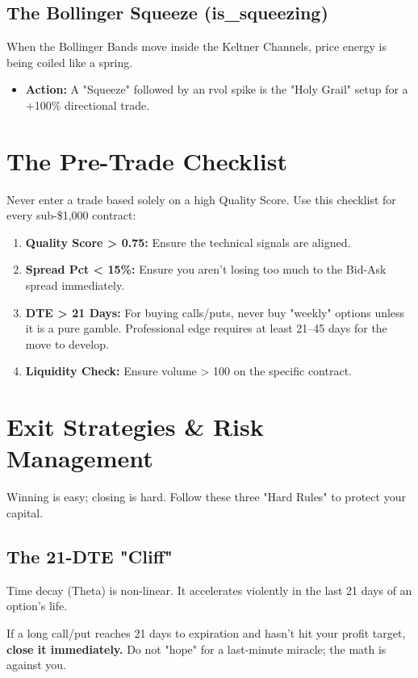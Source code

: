\documentclass[11pt,a4paper]{article}
\begin{document}
\subsection{The Bollinger Squeeze (is\_squeezing)}
When the Bollinger Bands move inside the Keltner Channels, price energy is being coiled like a spring.
\begin{itemize}
    \item \textbf{Action:} A "Squeeze" followed by an rvol spike is the "Holy Grail" setup for a +100\% directional trade.
\end{itemize}

\section{The Pre-Trade Checklist}
Never enter a trade based solely on a high Quality Score. Use this checklist for every sub-\$1,000 contract:

\begin{enumerate}
    \item \textbf{Quality Score > 0.75:} Ensure the technical signals are aligned.
    \item \textbf{Spread Pct < 15\%:} Ensure you aren't losing too much to the Bid-Ask spread immediately.
    \item \textbf{DTE > 21 Days:} For buying calls/puts, never buy "weekly" options unless it is a pure gamble. Professional edge requires at least 21--45 days for the move to develop.
    \item \textbf{Liquidity Check:} Ensure volume > 100 on the specific contract.
\end{enumerate}

\section{Exit Strategies \& Risk Management}
Winning is easy; closing is hard. Follow these three "Hard Rules" to protect your capital.

\subsection{The 21-DTE "Cliff"}
Time decay (Theta) is non-linear. It accelerates violently in the last 21 days of an option's life.
\begin{tcolorbox}[colback=red!5,colframe=red!75!black,title=The Exit Rule]
If a long call/put reaches 21 days to expiration and hasn't hit your profit target, \textbf{close it immediately.} Do not "hope" for a last-minute miracle; the math is against you.
\end{tcolorbox}
\end{document}

